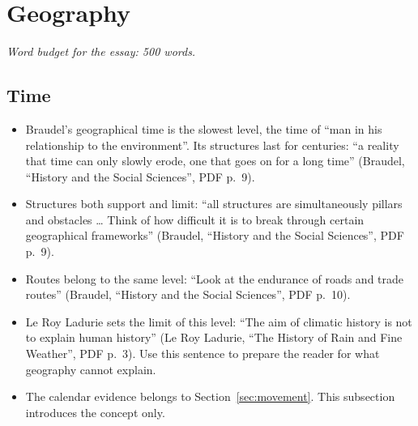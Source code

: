 \documentclass[11pt,a4paper]{article}
\newcommand{\cit}[1]{{\small(#1)}}
\newcommand{\budget}[1]{\par\noindent\textit{Word budget for the essay: #1 words.}\par\smallskip}
\newcommand{\Braudel}{Braudel, \enquote{History and the Social Sciences}}
\begin{document}
\section{Geography}
\budget{500}

\subsection{Time}
\begin{itemize}
\item Braudel's geographical time is the slowest level, the time of
  \enquote{man in his relationship to the environment}. Its structures last
  for centuries: \enquote{a reality that time can only slowly erode, one that
  goes on for a long time} \cit{\Braudel, PDF p.~9}.
\item Structures both support and limit: \enquote{all structures are
  simultaneously pillars and obstacles \dots{} Think of how difficult it is to
  break through certain geographical frameworks} \cit{\Braudel, PDF p.~9}.
\item Routes belong to the same level: \enquote{Look at the endurance of roads
  and trade routes} \cit{\Braudel, PDF p.~10}.
\item Le Roy Ladurie sets the limit of this level: \enquote{The aim of
  climatic history is not to explain human history} \cit{Le Roy Ladurie,
  \enquote{The History of Rain and Fine Weather}, PDF p.~3}. Use this sentence
  to prepare the reader for what geography cannot explain.
\item The calendar evidence belongs to Section~\ref{sec:movement}. This
  subsection introduces the concept only.
\end{itemize}
\end{document}
